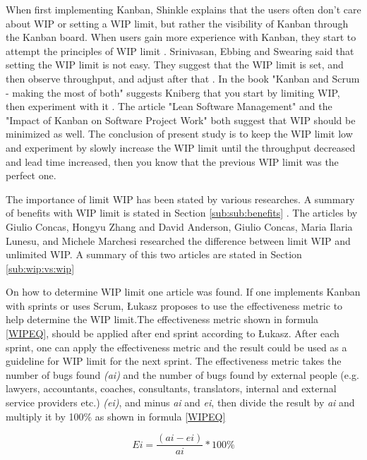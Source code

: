 \documentclass[UKenglish]{ifimaster}  %
\begin{document}
When first implementing Kanban, Shinkle explains that the users often don't care about WIP or setting a WIP limit, but rather the visibility of Kanban through the Kanban board. When users gain more experience with Kanban, they start to attempt the principles of WIP limit \parencite{Shinkle}. Srinivasan, Ebbing and Swearing said that setting the WIP limit is not easy. They suggest that the WIP limit is set, and then observe throughput, and adjust after that \parencite{Mandyam}. In the book "Kanban and Scrum - making the most of both" suggests Kniberg that you start by limiting WIP, then experiment with it \parencite{Kniberg}. The article "Lean Software Management" \parencite{Kniberg} and the "Impact of Kanban on Software Project Work" \parencite{Ikonen} both suggest that WIP should be minimized as well. The conclusion of present study is to keep the WIP limit low and experiment by slowly increase the WIP limit until the throughput decreased and lead time increased, then you know that the previous WIP limit was the perfect one.

The importance of limit WIP has been stated by various researches. A summary of benefits with WIP limit is stated in Section \ref{sub:sub:benefits} .  The articles by Giulio Concas, Hongyu Zhang \parencite{SMR:SMR1599}  and David Anderson, Giulio Concas, Maria Ilaria Lunesu, and Michele Marchesi \parencite{DavidAnderson} researched the difference between limit WIP and unlimited WIP.  A summary of this two articles are stated in Section \ref{sub:wip:vs:wip}

On how to determine WIP limit one article was found. If one implements Kanban with sprints or uses Scrum, \L ukasz proposes to use the effectiveness metric to help determine the WIP limit.The effectiveness metric shown in formula \ref{WIPEQ}, should be applied after end sprint according to \L ukasz. After each sprint, one can apply the effectiveness metric and the result could be used as a guideline for WIP limit for the next sprint. The effectiveness metric takes the number of bugs found \textit{(ai)} and the number of bugs found by external people (e.g. lawyers, accountants, coaches, consultants, translators, internal and external service providers etc.) \textit{(ei)}, and minus \textit{ai} and \textit{ei}, then divide the result by \textit{ai} and multiply it by 100\%  as shown in formula \ref{WIPEQ} \parencite{Sienkiewicz}

\begin{equation} \label{WIPEQ}
Ei=\frac{(ai-ei)}{ai}*100\%
\end{equation}
\end{document}
